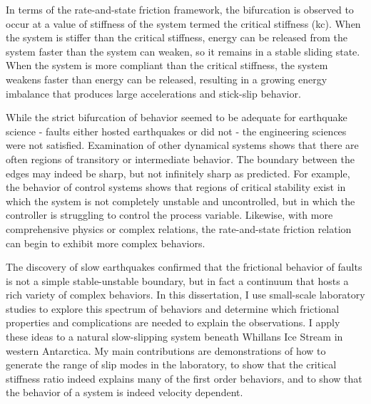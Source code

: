 In terms of the rate-and-state friction framework, the bifurcation is observed to occur at a value of stiffness of the system termed the critical stiffness (kc). When the system is stiffer than the critical stiffness, energy can be released from the system faster than the system can weaken, so it remains in a stable sliding state. When the system is more compliant than the critical stiffness, the system weakens faster than energy can be released, resulting in a growing energy imbalance that produces large accelerations and stick-slip behavior.  

While the strict bifurcation of behavior seemed to be adequate for earthquake science - faults either hosted earthquakes or did not - the engineering sciences were not satisfied. Examination of other dynamical systems shows that there are often regions of transitory or intermediate behavior. The boundary between the edges may indeed be sharp, but not infinitely sharp as predicted. For example, the behavior of control systems shows that regions of critical stability exist in which the system is not completely unstable and uncontrolled, but in which the controller is struggling to control the process variable. Likewise, with more comprehensive physics or complex relations, the rate-and-state friction relation can begin to exhibit more complex behaviors. 

The discovery of slow earthquakes confirmed that the frictional behavior of faults is not a simple stable-unstable boundary, but in fact a continuum that hosts a rich variety of complex behaviors. In this dissertation, I use small-scale laboratory studies to explore this spectrum of behaviors and determine which frictional properties and complications are needed to explain the observations. I apply these ideas to a natural slow-slipping system beneath Whillans Ice Stream in western Antarctica. My main contributions are demonstrations of how to generate the range of slip modes in the laboratory, to show that the critical stiffness ratio indeed explains many of the first order behaviors, and to show that the behavior of a system is indeed velocity dependent.
